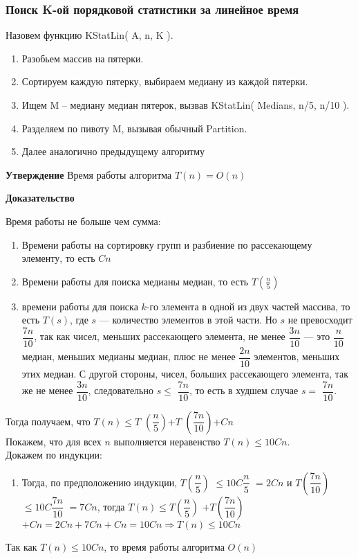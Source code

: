 \subsubsection*{Поиск K-ой порядковой статистики за линейное время}
Назовем функцию KStatLin( A, n, K ).
\begin{enumerate}
    \item Разобьем массив на пятерки.
    \item Сортируем каждую пятерку, выбираем медиану из каждой пятерки.
    \item Ищем M – медиану медиан пятерок, вызвав KStatLin( Medians, n/5, n/10 ).
    \item Разделяем по пивоту M, вызывая обычный Partition.
    \item Далее аналогично предыдущему алгоритму
\end{enumerate}

\textbf{Утверждение} Время работы алгоритма $T(n) = O(n)$

\textbf{Доказательство}

Время работы не больше чем сумма:
\begin{enumerate}
    \item Времени работы на сортировку групп и разбиение по рассекающему элементу, то есть $Cn$
    \item Времени работы для поиска медианы медиан, то есть $T\left( \frac{n}{5}\right)$
    \item времени работы для поиска $k$-го элемента в одной из двух частей массива, то есть $T(s)$, где $s$ — количество элементов в этой части. Но $s$ не превосходит $\dfrac{7n}{10}$, так как чисел, меньших рассекающего элемента, не менее $\dfrac{3n}{10}$ — это $\dfrac{n}{10}$ медиан, меньших медианы медиан, плюс не менее $\dfrac{2n}{10}$ элементов, меньших этих медиан. С другой стороны, чисел, больших рассекающего элемента, так же не менее $\dfrac{3n}{10}$, следовательно  $ s \leqslant $ $\dfrac{7n}{10}$, то есть в худшем случае $ s = $ $\dfrac{7n}{10}$. 
\end{enumerate}

\parbox[t]{0.95\linewidth}{
    Тогда получаем, что  $T(n) \leqslant T$ $\left(\dfrac{n}{5}\right)$$ + T$ $\left(\dfrac{7n}{10}\right)$$ + Cn $
    \\
    Покажем, что для всех $ n $ выполняется неравенство $T(n) \leqslant 10Cn $.
    \\
    Докажем по индукции: 
    \begin{enumerate}
      , что наше неравенство $T(n) \leqslant 10Cn $ выполняется при малых $ n $, для некоторой достаточно большой константы $ C $. 
      \item Тогда, по предположению индукции, $T$$\left(\dfrac{n}{5}\right)$ $ \leqslant 10C $$\dfrac{n}{5}$ $ = 2Cn$ и $ T$$\left(\dfrac{7n}{10}\right)$ $ \leqslant 10C $$\dfrac{7n}{10}$ $ = 7Cn$, тогда
      $T(n) \leqslant T$$\left(\dfrac{n}{5}\right)$ $ +  T$$\left(\dfrac{7n}{10}\right)$ $ +  Cn = 2Cn + 7Cn + Cn = 10Cn \Rightarrow T(n) \leqslant 10Cn$
    \end{enumerate}
    
    Так как $T(n) \leqslant 10Cn $, то время работы алгоритма $O(n)$
}

